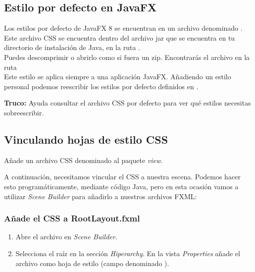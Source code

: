\subsection{Estilo por defecto en JavaFX}
Los estilos por defecto de JavaFX 8 se encuentran en un archivo denominado . 
Este archivo CSS se encuentra dentro del archivo jar  que se encuentra en tu 
directorio de instalación de Java, en la ruta .\\
Puedes descomprimir  o abrirlo como si fuera un zip. Encontrarás el archivo 
 en la ruta \\
Este estilo se aplica siempre a una aplicación JavaFX. Añadiendo un estilo personal 
podemos reescribir los estilos por defecto definidos en .

\begin{tcolorbox}[leftrule=3mm]
	\textbf{Truco:} Ayuda consultar el archivo CSS por defecto para ver qué estilos necesitas sobreescribir.
\end{tcolorbox}
\subsection{Vinculando hojas de estilo CSS}
Añade un archivo CSS denominado  al paquete \textit{view}.\\

%
%
A continuación, necesitamos vincular el CSS a nuestra escena. Podemos hacer esto programáticamente, 
mediante código Java, pero en esta ocasión vamos a utilizar \textit{Scene Builder} para añadirlo a 
nuestros archivos FXML:\\
\subsubsection*{Añade el CSS a RootLayout.fxml}
\begin{enumerate}
    \item Abre el archivo  en \textit{Scene Builder}.
    \item Selecciona el  raíz en la sección \textit{Hiperarchy}. En la vista \textit{Properties} añade 
    el archivo  como hoja de estilo (campo denominado ).
\end{enumerate}

